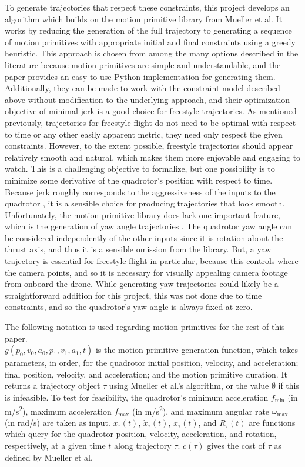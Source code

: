 \documentclass[pageno]{jpaper}
\begin{document}
To generate trajectories that respect these constraints, this project develops an algorithm which builds on the motion primitive library from Mueller et al. It works by reducing the generation of the full trajectory to generating a sequence of motion primitives with appropriate initial and final constraints using a greedy heuristic. This approach is chosen from among the many options described in the literature because motion primitives are simple and understandable, and the paper provides an easy to use Python implementation for generating them. Additionally, they can be made to work with the constraint model described above without modification to the underlying approach, and their optimization objective of minimal jerk is a good choice for freestyle trajectories. As mentioned previously, trajectories for freestyle flight do not need to be optimal with respect to time or any other easily apparent metric, they need only respect the given constraints. However, to the extent possible, freestyle trajectories should appear relatively smooth and natural, which makes them more enjoyable and engaging to watch. This is a challenging objective to formalize, but one possibility is to minimize some derivative of the quadrotor's position with respect to time. Because jerk roughly corresponds to the aggressiveness of the inputs to the quadrotor \cite{mueller}, it is a sensible choice for producing trajectories that look smooth. Unfortunately, the motion primitive library does lack one important feature, which is the generation of yaw angle trajectories \cite{mueller}. The quadrotor yaw angle can be considered independently of the other inputs since it is rotation about the thrust axis, and thus it is a sensible omission from the library. But, a yaw trajectory is essential for freestyle flight in particular, because this controls where the camera points, and so it is necessary for visually appealing camera footage from onboard the drone. While generating yaw trajectories could likely be a straightforward addition for this project, this was not done due to time constraints, and so the quadrotor's yaw angle is always fixed at zero.

The following notation is used regarding motion primitives for the rest of this paper. \\ $g(p_0, v_0, a_0, p_1, v_1, a_1, t)$ is the motion primitive generation function, which takes parameters, in order, for the quadrotor initial position, velocity, and acceleration; final position, velocity, and acceleration; and the motion primitive duration. It returns a trajectory object $\tau$ using Mueller et al.'s algorithm, or the value $\emptyset$ if this is infeasible. To test for feasibility, the quadrotor's minimum acceleration $f_{\min}$ (in \unit{m/s^2}), maximum acceleration $f_{\max}$ (in \unit{m/s^2}), and maximum angular rate $\omega_{\max}$ (in \unit{rad/s}) are taken as input. $x_{\tau}(t)$, $\dot x_{\tau}(t)$, $\ddot x_{\tau}(t)$, and $R_{\tau}(t)$ are functions which query for the quadrotor position, velocity, acceleration, and rotation, respectively, at a given time $t$ along trajectory $\tau$. $c(\tau)$ gives the cost of $\tau$ as defined by Mueller et al.
\end{document}
